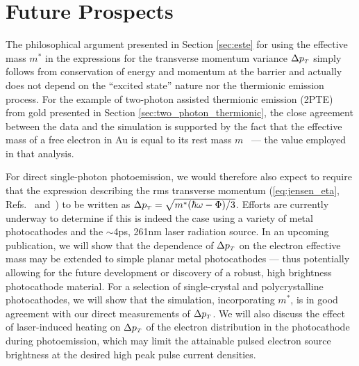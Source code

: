 \section{Future Prospects} \label{sec:photocathode_future}

The philosophical argument presented in Section \ref{sec:este} for using the effective mass $m^*$ in the expressions for the transverse momentum variance $\Delta p_{{\scriptscriptstyle T}}$ simply follows from conservation of energy and momentum at the barrier and actually does not depend on the ``excited state'' nature nor the thermionic emission process.
For the example of two-photon assisted thermionic emission (2PTE) from gold presented in Section \ref{sec:two_photon_thermionic}, the close agreement between the data and the simulation is supported by the fact that the effective mass of a free electron in Au is equal to its rest mass $m$~\cite{johnson_optical_1972} --- the value employed in that analysis.

For direct single-photon photoemission, we would therefore also expect to require that the expression describing the rms transverse momentum (\ref{eq:jensen_eta}, Refs.~\cite{dowell_quantum_2009} and~\cite{jensen_emittance_2010}) to be written as $\Delta p_{{\scriptscriptstyle T}} = \sqrt{m^* ( \hbar \omega - \Phi ) / 3 }$.
Efforts are currently underway to determine if this is indeed the case using a variety of metal photocathodes and the $\sim$4ps, 261nm laser radiation source.
In an upcoming publication, we will show that the dependence of $\Delta p_{{\scriptscriptstyle T}}$ on the electron effective mass may be extended to simple planar metal photocathodes --- thus potentially allowing for the future development or discovery of a robust, high brightness photocathode material.
For a selection of single-crystal and polycrystalline photocathodes, we will show that the simulation, incorporating $m^*$, is in good agreement with our direct measurements of $\Delta p_{{\scriptscriptstyle T}}$.
We will also discuss the effect of laser-induced heating on $\Delta p_{{\scriptscriptstyle T}}$ of the electron distribution in the photocathode during photoemission, which may limit the attainable pulsed electron source brightness at the desired high peak pulse current densities.
